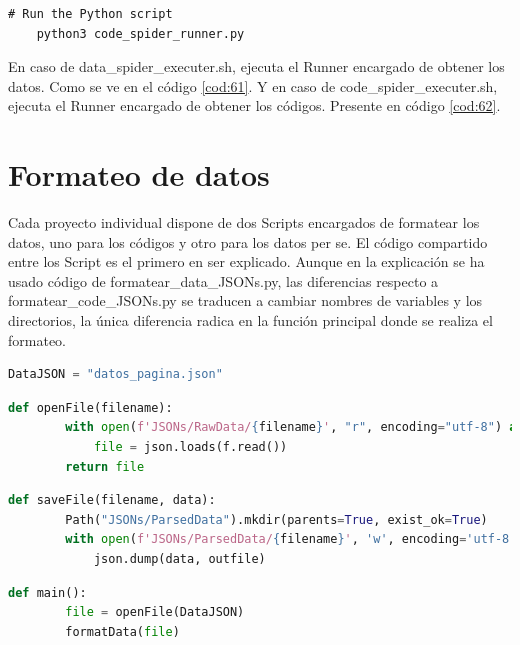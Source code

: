 \begin{lstlisting}[caption={Ejecución de code\_spider\_runner.py}, label=cod:62]
	# Run the Python script
	python3 code_spider_runner.py
\end{lstlisting}

En caso de data\_spider\_executer.sh, ejecuta el Runner encargado de obtener los datos. Como se ve en el código \ref{cod:61}. Y en caso de code\_spider\_executer.sh, ejecuta el Runner encargado de obtener los códigos. Presente en código \ref{cod:62}.

\section{Formateo de datos}
Cada proyecto individual dispone de dos Scripts encargados de formatear los datos, uno para los códigos y otro para los datos per se. El código compartido entre los Script es el primero en ser explicado. Aunque en la explicación se ha usado código de formatear\_data\_JSONs.py, las diferencias respecto a formatear\_code\_JSONs.py se traducen a cambiar nombres de variables y los directorios, la única diferencia radica en la función principal donde se realiza el formateo.

\begin{lstlisting}[language=Python, caption={Declaración variable del JSON que se desea usar}, label=cod:63]
	DataJSON = "datos_pagina.json"
\end{lstlisting}

\begin{lstlisting}[language=Python, caption={Declaración función \textit{openFile()}}, label=cod:64]
	def openFile(filename):
		with open(f'JSONs/RawData/{filename}', "r", encoding="utf-8") as f:
			file = json.loads(f.read())
		return file
\end{lstlisting}

\begin{lstlisting}[language=Python, caption={Declaración función \textit{saveFile()}}, label=cod:65]
	def saveFile(filename, data):
		Path("JSONs/ParsedData").mkdir(parents=True, exist_ok=True)
		with open(f'JSONs/ParsedData/{filename}', 'w', encoding='utf-8') as outfile:
			json.dump(data, outfile)
\end{lstlisting}

\begin{lstlisting}[language=Python, caption={Declaración función \textit{main()}}, label=cod:66]
	def main():
		file = openFile(DataJSON)
		formatData(file)
\end{lstlisting}

